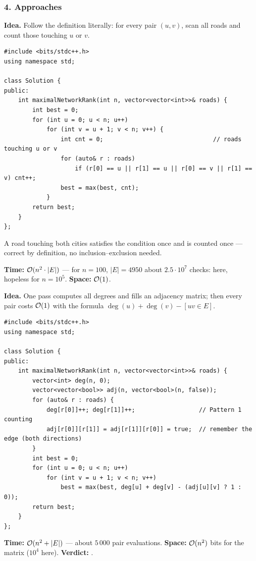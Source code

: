 \subsubsection*{4. Approaches}

\begin{bruteforcebox}
\textbf{Idea.} Follow the definition literally: for every pair $(u,v)$, scan all roads and count those touching $u$ or $v$.
\begin{lstlisting}[style=cpp]
#include <bits/stdc++.h>
using namespace std;

class Solution {
public:
    int maximalNetworkRank(int n, vector<vector<int>>& roads) {
        int best = 0;
        for (int u = 0; u < n; u++)
            for (int v = u + 1; v < n; v++) {
                int cnt = 0;                               // roads touching u or v
                for (auto& r : roads)
                    if (r[0] == u || r[1] == u || r[0] == v || r[1] == v) cnt++;
                best = max(best, cnt);
            }
        return best;
    }
};
\end{lstlisting}
A road touching both cities satisfies the condition once and is counted once --- correct by definition, no inclusion--exclusion needed.
\begin{complexitybox}
\textbf{Time:} $\mathcal{O}(n^2 \cdot |E|)$ --- for $n = 100$, $|E| = 4950$ about $2.5 \cdot 10^7$ checks: \ac{} here, hopeless for $n = 10^5$. \textbf{Space:} $\mathcal{O}(1)$.
\end{complexitybox}
\end{bruteforcebox}

\begin{algorithmbox}
\textbf{Idea.} One pass computes all degrees and fills an adjacency matrix; then every pair costs $\mathcal{O}(1)$ with the formula $\deg(u) + \deg(v) - [uv \in E]$.
\begin{lstlisting}[style=cpp]
#include <bits/stdc++.h>
using namespace std;

class Solution {
public:
    int maximalNetworkRank(int n, vector<vector<int>>& roads) {
        vector<int> deg(n, 0);
        vector<vector<bool>> adj(n, vector<bool>(n, false));
        for (auto& r : roads) {
            deg[r[0]]++; deg[r[1]]++;                  // Pattern 1 counting
            adj[r[0]][r[1]] = adj[r[1]][r[0]] = true;  // remember the edge (both directions)
        }
        int best = 0;
        for (int u = 0; u < n; u++)
            for (int v = u + 1; v < n; v++)
                best = max(best, deg[u] + deg[v] - (adj[u][v] ? 1 : 0));
        return best;
    }
};
\end{lstlisting}
\begin{complexitybox}
\textbf{Time:} $\mathcal{O}(n^2 + |E|)$ --- about $5\,000$ pair evaluations. \textbf{Space:} $\mathcal{O}(n^2)$ bits for the matrix ($10^4$ here). \textbf{Verdict:} \ac{}.
\end{complexitybox}
\end{algorithmbox}

